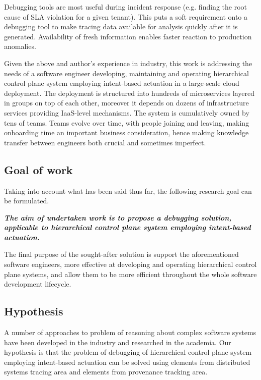 Debugging tools are most useful during incident response (e.g. finding the root cause of SLA violation for a given tenant). This puts a soft requirement onto a debugging tool to make tracing data available for analysis quickly after it is generated. Availability of fresh information enables faster reaction to production anomalies.

Given the above and author's experience in industry, this work is addressing the needs of a software engineer developing, maintaining and operating hierarchical control plane system employing intent-based actuation in a large-scale cloud deployment. The deployment is structured into hundreds of microservices layered in groups on top of each other, moreover it depends on dozens of infrastructure services providing IaaS-level mechanisms. The system is cumulatively owned by tens of teams. Teams evolve over time, with people joining and leaving, making onboarding time an important business consideration, hence making knowledge transfer between engineers both crucial and sometimes imperfect.

\subsection{Goal of work}\label{sec:thesis-goal}

Taking into account what has been said thus far, the following research goal can be formulated.

\bigskip

\textbf{\textit{The aim of undertaken work is to propose a debugging solution, applicable to hierarchical control plane system employing intent-based actuation.}}

\bigskip

The final purpose of the sought-after solution is support the aforementioned software engineers, more effective at developing and operating hierarchical control plane systems, and allow them to be more efficient throughout the whole software development lifecycle.

\subsection{Hypothesis}

A number of approaches to problem of reasoning about complex software systems have been developed in the industry and researched in the academia. Our hypothesis is that the problem of debugging of hierarchical control plane system employing intent-based actuation can be solved using elements from distributed systems tracing area and elements from provenance tracking area.

